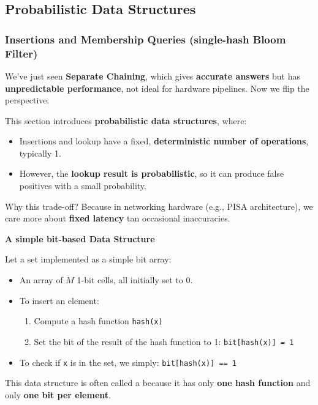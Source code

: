 \subsection{Probabilistic Data Structures}\label{subsection: Probabilistic Data Structures}

\subsubsection{Insertions and Membership Queries (single-hash Bloom Filter)}

We've just seen \textbf{Separate Chaining}, which gives \textbf{accurate answers} but has \textbf{unpredictable performance}, not ideal for hardware pipelines. Now we flip the perspective.

\highspace
This section introduces \textbf{probabilistic data structures}, where:
\begin{itemize}
    \item[\textcolor{Green3}{\faIcon{check}}] Insertions and lookup have a fixed, \textcolor{Green3}{\textbf{deterministic number of operations}}, typically 1.
    \item[\textcolor{Red2}{\faIcon{times}}] However, the \textcolor{Red2}{\textbf{lookup result is probabilistic}}, so it can produce false positives with a small probability.
\end{itemize}
Why this trade-off? Because in networking hardware (e.g., PISA architecture), we care more about \textbf{fixed latency} tan occasional inaccuracies.

\highspace
\begin{flushleft}
    \textcolor{Green3}{ \textbf{A simple bit-based Data Structure}}
\end{flushleft}
Let a set implemented as a simple bit array:
\begin{itemize}
    \item An array of $M$ 1-bit cells, all initially set to $0$.
    \item To insert an element:
    \begin{enumerate}
        \item Compute a hash function \texttt{hash(x)}
        \item Set the bit of the result of the hash function to 1: \texttt{bit[hash(x)] = 1}
    \end{enumerate}
    \item To check if \texttt{x} is in the set, we simply: \texttt{bit[hash(x)] == 1}
\end{itemize}
This data structure is often called a  because it has only \textbf{one hash function} and only \textbf{one bit per element}.


